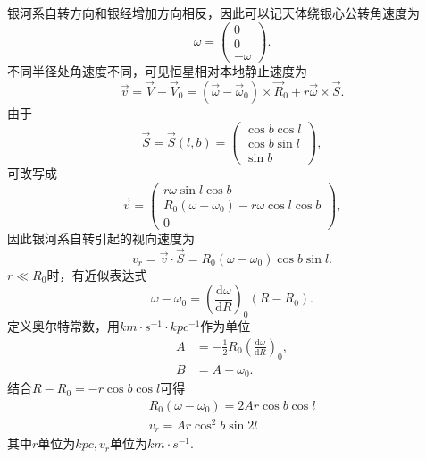 \documentclass[11pt, a4paper, oneside]{ctexart}
\numberwithin{equation}{subsection}
\begin{document}
银河系自转方向和银经增加方向相反，因此可以记天体绕银心公转角速度为
\begin{equation}
\omega=\begin{pmatrix}
0\\
0\\
-\omega
\end{pmatrix}.
\end{equation}
不同半径处角速度不同，可见恒星相对本地静止速度为
\begin{equation}
\vec{v}=\vec{V}-\vec{V}_{0}=\left(\vec{\omega}-\vec{\omega}_{0}\right)\times\vec{R}_{0}+r\vec{\omega}\times\vec{S}.
\end{equation}
由于
\begin{equation}
\vec S=\vec S\left(l,b\right)=\begin{pmatrix}
\cos b\cos l\\
\cos b\sin l\\
\sin b
\end{pmatrix},
\end{equation}
可改写成
\begin{equation}
\vec v=\begin{pmatrix}
r\omega\sin l\cos b\\
R_0\left(\omega-\omega_0\right)-r\omega\cos l\cos b\\
0
\end{pmatrix},
\end{equation}
因此银河系自转引起的视向速度为
\begin{equation}
v_r=\vec v\cdot\vec S=R_0\left(\omega-\omega_0\right)\cos b\sin l.
\end{equation}
$r\ll R_{0}$时，有近似表达式
\begin{equation}
\omega-\omega_{0}=\left(\frac{\mathrm{d}\omega}{\mathrm{d}R}\right)_{0}\left(R-R_{0}\right).
\end{equation}
定义奥尔特常数，用$\unit{km\cdot{}s^{-1}\cdot kpc^{-1}}$作为单位
\begin{align}
A&=-\frac12R_0\left(\frac{\mathrm{d}\omega}{\mathrm{d}R}\right)_0,\\
B&=A-\omega_0.
\end{align}
结合$R-R_{0}=-r\cos b\cos l$可得
\begin{align}
R_0\left(\omega-\omega_0\right)=2Ar\cos b\cos l\\
v_r=Ar\cos^2b\sin2l
\end{align}
其中$r$单位为$\unit{kpc},v_r$单位为$\unit{km\cdot{}s^{-1}}$.
\end{document}
